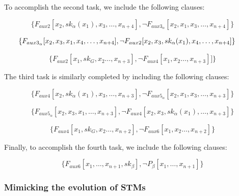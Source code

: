 \documentclass[%
  manuscript=article,   %
  year=2024,
  volume=77,
  doi=00000.000,
]{zfn}
\begin{document}
To accomplish the second task, we include the following clauses:

\begin{equation}
\{F_{aux2}[x_2, sk_{\alpha}(x_1), x_3, \ldots, x_{n+4}], 
\neg F_{aux3_{\alpha}}[x_2, x_1, x_3, \ldots, x_{n+4}]\}
\end{equation}

\begin{equation}
\hspace{-0.5cm} \{F_{aux3_{\alpha}}[x_2, x_3, x_1, x_4, \ldots, x_{n+4}],
\neg F_{aux2}[x_2, x_3, sk_{\alpha}(x_1), x_4, \ldots , x_{n+4}]\}
\end{equation}

\begin{equation}
\{F_{aux2}[x_1, sk_G, x_2\ldots, x_{n+3}],
\neg F_{aux4}[x_1, x_2 \ldots, x_{n+3}]]\}
\end{equation}

The third task is similarly completed by including the following clauses:

\begin{equation}\{F_{aux4}[x_2, sk_{\alpha}(x_1), x_3, \ldots, x_{n+3}], 
\neg F_{aux5_{\alpha}}[x_2, x_1, x_3, \ldots, x_{n+3}]\}
\end{equation}

\begin{equation}
\{F_{aux5_{\alpha}}[x_2, x_3, x_1, \ldots, x_{n+3}],
\neg F_{aux4}[x_2, x_3, sk_{\alpha}(x_1), \ldots, x_{n+3}]\}
\end{equation}

\begin{equation}
\{F_{aux4}[x_1, sk_G, x_2 \ldots, x_{n+2}],
\neg F_{aux6}[x_1, x_2 \ldots, x_{n+2}]\}
\end{equation}

Finally, to accomplish the fourth task, we include the following clauses:

\begin{equation}
\{F_{aux6}[x_1, \ldots, x_{n+1}, sk_\beta],
\neg P_\beta[x_1, \ldots, x_{n+1}]\} \label{Pbeta}
\end{equation}

\subsubsection{Mimicking the evolution of STMs}
\end{document}
